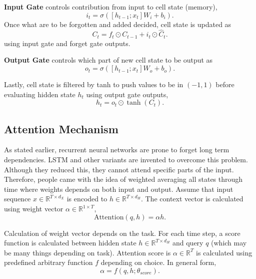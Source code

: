 \textbf{Input Gate} controls contribution from input to cell state (memory), 
\begin{equation}
\label{eqn:lstm_inp}
i_t = \sigma( [h_{t-1}; x_t] W_i + b_{i}).
\end{equation}
Once what are to be forgotten and added decided, cell state is updated as
\begin{equation}
\label{eqn:lstm_cellstupt}
C_t = f_t \odot C_{t-1} + i_t \odot \hat{C}_t.
\end{equation}
using input gate and forget gate outputs.

\textbf{Output Gate} controls which part of new cell state to be output as
\begin{equation}
\label{eqn:lstm_out}
o_t = \sigma( [h_{t-1}; x_t] W_o + b_o).
\end{equation}

Lastly, cell state is filtered by tanh to push values to be in $(-1,1)$ before evaluating hidden state $h_t$ using output gate outputs,
\begin{equation}
h_t = o_t \odot \tanh(C_t).
\end{equation}

\subsection{Attention Mechanism}

As stated earlier, recurrent neural networks are prone to forget long term dependencies. 
LSTM and other variants are invented to overcome this problem. 
Although they reduced this, they cannot attend specific parts of the input. 
Therefore, people came with the idea of weighted averaging all states through time where weights depends on both input and output. 
Assume that input sequence $x \in \mathbb{R}^{T \times d_X}$ is encoded to $h \in \mathbb{R}^{T \times d_H}$. 
The context vector is calculated using weight vector $\alpha \in \mathbb{R}^{1 \times T}$,
\begin{equation}
\mathrm{Attention}(q, h) = \alpha h. %
\label{eq:attention_generic}
\end{equation}

Calculation of weight vector depends on the task. 
For each time step, a score function is calculated between hidden state $h \in \mathbb{R}^{T \times d_H}$ and query $q$ (which may be many things depending on task). 
Attention score is $\alpha \in \mathbb{R}^{T}$ is calculated using predefined arbitrary function $f$ depending on choice. In general form,  
\begin{equation}
\alpha = f(q, h; \theta_{score}).
\end{equation}

